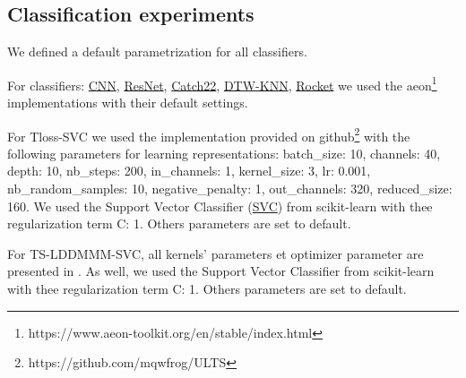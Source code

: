 \subsection{Classification experiments}
\label{appendix:classification_implementation}

We defined a default parametrization for all classifiers. 

For classifiers: \href{https://www.aeon-toolkit.org/en/stable/api_reference/auto_generated/aeon.classification.deep_learning.CNNClassifier.html#aeon.classification.deep_learning.CNNClassifier}{CNN}, 
\href{https://www.aeon-toolkit.org/en/stable/api_reference/auto_generated/aeon.networks.ResNetNetwork.html#aeon.networks.ResNetNetwork}{ResNet}, 
\href{https://www.aeon-toolkit.org/en/stable/api_reference/auto_generated/aeon.classification.feature_based.Catch22Classifier.html#aeon.classification.feature_based.Catch22Classifier}{Catch22}, 
\href{https://www.aeon-toolkit.org/en/stable/api_reference/auto_generated/aeon.classification.distance_based.KNeighborsTimeSeriesClassifier.html#aeon.classification.distance_based.KNeighborsTimeSeriesClassifier}{DTW-KNN}, 
\href{https://www.aeon-toolkit.org/en/stable/api_reference/auto_generated/aeon.classification.convolution_based.RocketClassifier.html#aeon.classification.convolution_based.RocketClassifier}{Rocket}
we used the aeon\footnote{https://www.aeon-toolkit.org/en/stable/index.html} implementations with their default settings. 

For Tloss-SVC we used the implementation provided on github\footnote{https://github.com/mqwfrog/ULTS} 
with the following parameters for learning representations: batch\_size: 10, channels: 40, depth: 10, nb\_steps: 200, in\_channels: 1, 
kernel\_size: 3, lr: 0.001, nb\_random\_samples: 10, negative\_penalty: 1, out\_channels: 320, reduced\_size: 160. 
We used the Support Vector Classifier (\href{https://scikit-learn.org/stable/modules/generated/sklearn.svm.SVC.html#sklearn.svm.SVC}{SVC})
from scikit-learn with thee regularization term C: 1. Others parameters are set to default.

For TS-LDDMMM-SVC, all kernels' parameters et optimizer parameter are presented in .
As well, we used the Support Vector Classifier from scikit-learn with thee regularization term C: 1. Others parameters are set to default.


